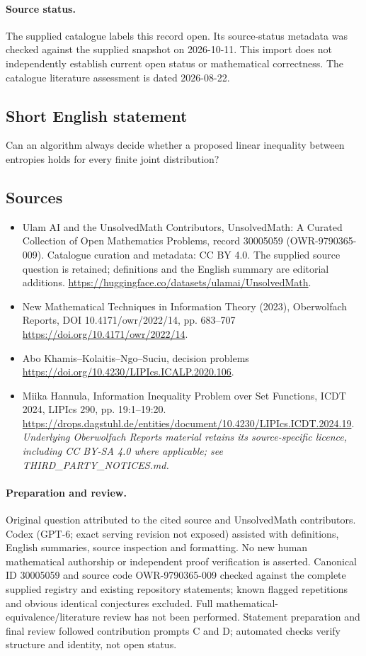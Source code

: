 \documentclass[11pt]{article}
\begin{document}
\paragraph{Source status.}
The supplied catalogue labels this record open. Its source-status metadata was checked against the supplied snapshot on 2026-10-11. This import does not independently establish current open status or mathematical correctness. The catalogue literature assessment is dated 2026-08-22.
\subsection{Short English statement}
Can an algorithm always decide whether a proposed linear inequality between entropies holds for every finite joint distribution?
\subsection{Sources}
\begin{itemize}
\item[S1] Ulam AI and the UnsolvedMath Contributors, UnsolvedMath: A Curated Collection of Open Mathematics Problems, record 30005059 (OWR-9790365-009). Catalogue curation and metadata: CC BY 4.0. The supplied source question is retained; definitions and the English summary are editorial additions.
\url{https://huggingface.co/datasets/ulamai/UnsolvedMath}.
\item[S2] New Mathematical Techniques in Information Theory (2023), Oberwolfach Reports, DOI 10.4171/owr/2022/14, pp. 683--707
\url{https://doi.org/10.4171/owr/2022/14}.
\item[S3] Abo Khamis--Kolaitis--Ngo--Suciu, decision problems
\url{https://doi.org/10.4230/LIPIcs.ICALP.2020.106}.
\item[S4] Miika Hannula, Information Inequality Problem over Set Functions, ICDT 2024, LIPIcs 290, pp. 19:1--19:20.
\url{https://drops.dagstuhl.de/entities/document/10.4230/LIPIcs.ICDT.2024.19}.
\textit{Underlying Oberwolfach Reports material retains its source-specific licence, including CC BY-SA 4.0 where applicable; see THIRD\_PARTY\_NOTICES.md.}
\end{itemize}
\paragraph{Preparation and review.}
Original question attributed to the cited source and UnsolvedMath contributors. Codex (GPT-6; exact serving revision not exposed) assisted with definitions, English summaries, source inspection and formatting. No new human mathematical authorship or independent proof verification is asserted. Canonical ID 30005059 and source code OWR-9790365-009 checked against the complete supplied registry and existing repository statements; known flagged repetitions and obvious identical conjectures excluded. Full mathematical-equivalence/literature review has not been performed. Statement preparation and final review followed contribution prompts C and D; automated checks verify structure and identity, not open status.
\label{end:30005059}
\end{document}
